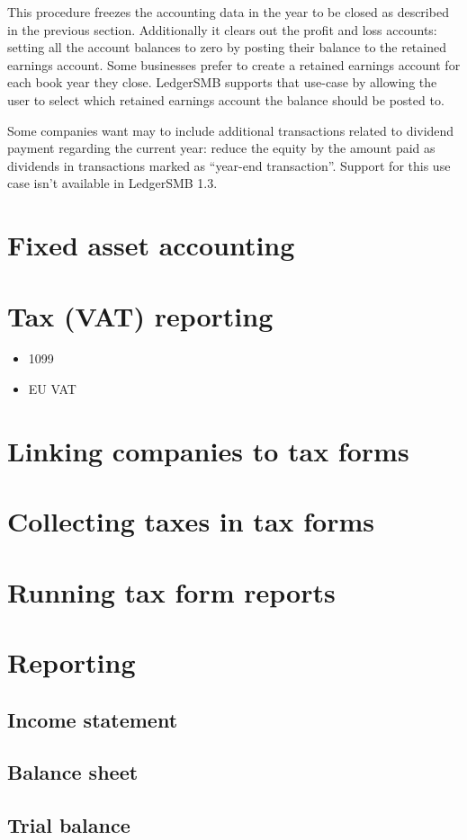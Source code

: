 This procedure freezes the accounting data in the year to be closed as described
in the previous section. Additionally it clears out the profit and loss accounts:
setting all the account
balances to zero by posting their balance to the retained earnings account. Some
businesses prefer to create a retained earnings account for each book year they
close. LedgerSMB supports that use-case by allowing the user to select which
retained earnings account the balance should be posted to.

Some companies want may to include additional transactions related to dividend
payment regarding the current year: reduce the equity by the amount paid as
dividends in transactions marked as ``year-end transaction''. Support
for this use case isn't available in LedgerSMB 1.3.




\section{Fixed asset accounting}
\label{sec:FixedAssetAccounting}


\section{Tax (VAT) reporting}



\begin{itemize}
\item 1099
\item EU VAT
\end{itemize}


\section{Linking companies to tax forms}


\section{Collecting taxes in tax forms}


\section{Running tax form reports}


\section{Reporting}
\subsection{Income statement}
\subsection{Balance sheet}
\subsection{Trial balance}


